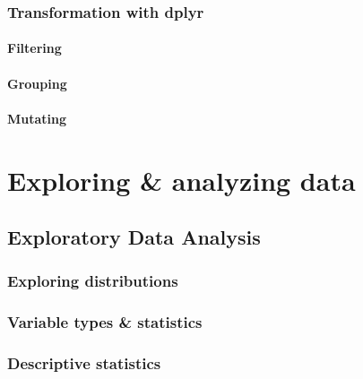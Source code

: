 \documentclass[
]{book}
\begin{document}
\hypertarget{transformation-with-dplyr}{%
\section{Transformation with dplyr}\label{transformation-with-dplyr}}

\hypertarget{filtering-1}{%
\subsection{Filtering}\label{filtering-1}}

\hypertarget{grouping-1}{%
\subsection{Grouping}\label{grouping-1}}

\hypertarget{mutating}{%
\subsection{Mutating}\label{mutating}}

\hypertarget{part-exploring-analyzing-data}{%
\part{Exploring \& analyzing data}\label{part-exploring-analyzing-data}}

\hypertarget{exploratory-data-analysis}{%
\chapter{Exploratory Data Analysis}\label{exploratory-data-analysis}}

\hypertarget{exploring-distributions}{%
\section{Exploring distributions}\label{exploring-distributions}}

\hypertarget{variable-types-statistics}{%
\section{Variable types \& statistics}\label{variable-types-statistics}}

\hypertarget{descriptive-statistics}{%
\section{Descriptive statistics}\label{descriptive-statistics}}
\end{document}

